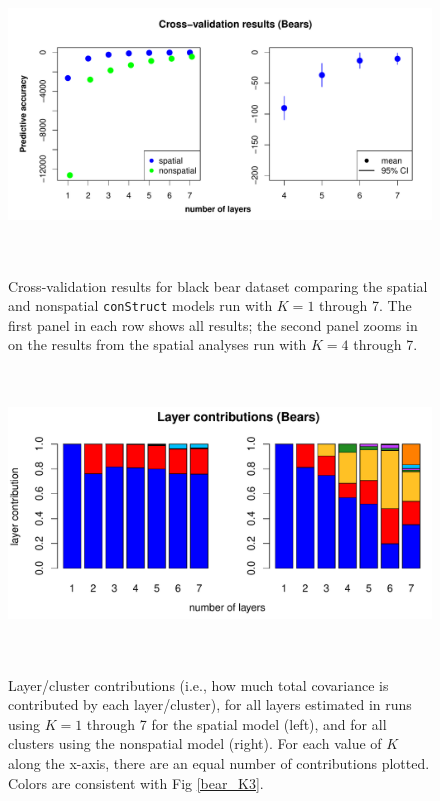 \documentclass[12pt]{article}
\begin{document}
\begin{figure}
	\centering
		{\includegraphics[width=6in,height=3in]{figs/bears/bear_std_xval.pdf}}
	\caption{
	Cross-validation results for black bear dataset 
	comparing the spatial and nonspatial \texttt{conStruct} models run with $K=1$ through 7.  
	The first panel in each row shows all results; 
	the second panel zooms in on the results from the spatial analyses run with $K = 4$ through 7.
    }\label{bear_xvals}
\end{figure}

\begin{figure}
	\centering
		{\includegraphics[width=6in,height=3in]{figs/bears/bears_laycon_barplots.pdf}}
	\caption{
	Layer/cluster contributions (i.e., how much total covariance is contributed by each layer/cluster), 
	for all layers estimated in runs using $K = 1$ through 7 
	for the spatial model (left),
	and for all clusters using the nonspatial model (right).
	For each value of $K$ along the x-axis, there are an equal number of contributions plotted.
	Colors are consistent with Fig \ref{bear_K3}.
    }\label{bear_laycon}
\end{figure}
\end{document}
